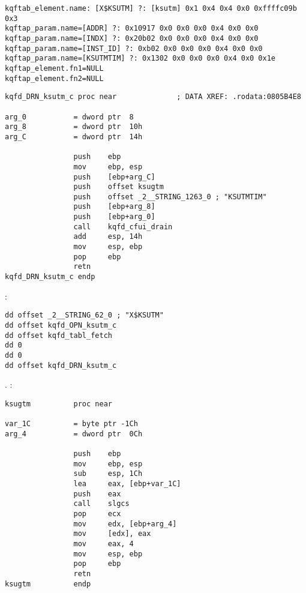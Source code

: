 \begin{lstlisting}
kqftab_element.name: [X$KSUTM] ?: [ksutm] 0x1 0x4 0x4 0x0 0xffffc09b 0x3
kqftap_param.name=[ADDR] ?: 0x10917 0x0 0x0 0x0 0x4 0x0 0x0
kqftap_param.name=[INDX] ?: 0x20b02 0x0 0x0 0x0 0x4 0x0 0x0
kqftap_param.name=[INST_ID] ?: 0xb02 0x0 0x0 0x0 0x4 0x0 0x0
kqftap_param.name=[KSUTMTIM] ?: 0x1302 0x0 0x0 0x0 0x4 0x0 0x1e
kqftap_element.fn1=NULL
kqftap_element.fn2=NULL
\end{lstlisting}


\begin{lstlisting}
kqfd_DRN_ksutm_c proc near              ; DATA XREF: .rodata:0805B4E8

arg_0           = dword ptr  8
arg_8           = dword ptr  10h
arg_C           = dword ptr  14h

                push    ebp
                mov     ebp, esp
                push    [ebp+arg_C]
                push    offset ksugtm
                push    offset _2__STRING_1263_0 ; "KSUTMTIM"
                push    [ebp+arg_8]
                push    [ebp+arg_0]
                call    kqfd_cfui_drain
                add     esp, 14h
                mov     esp, ebp
                pop     ebp
                retn
kqfd_DRN_ksutm_c endp
\end{lstlisting}

    :

\begin{lstlisting}
dd offset _2__STRING_62_0 ; "X$KSUTM"
dd offset kqfd_OPN_ksutm_c
dd offset kqfd_tabl_fetch
dd 0
dd 0
dd offset kqfd_DRN_ksutm_c
\end{lstlisting}

. :

\begin{lstlisting}
ksugtm          proc near

var_1C          = byte ptr -1Ch
arg_4           = dword ptr  0Ch

                push    ebp
                mov     ebp, esp
                sub     esp, 1Ch
                lea     eax, [ebp+var_1C]
                push    eax
                call    slgcs
                pop     ecx
                mov     edx, [ebp+arg_4]
                mov     [edx], eax
                mov     eax, 4
                mov     esp, ebp
                pop     ebp
                retn
ksugtm          endp
\end{lstlisting}

